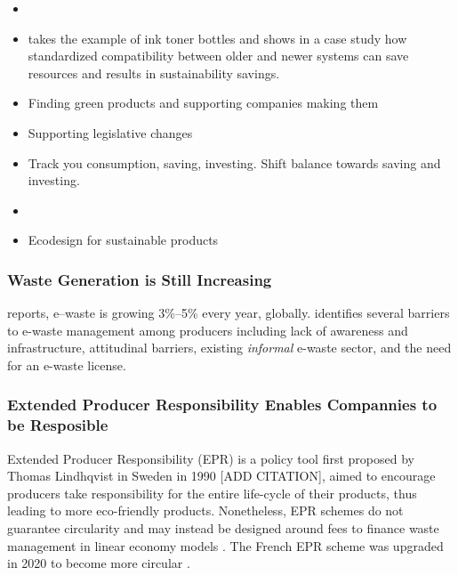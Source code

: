 \documentclass[
  letterpaper,
  DIV=11,
  numbers=noendperiod]{scrartcl}
\begin{document}
\begin{itemize}
\item
  \citet{RUIZPASTOR2022130495}
\item
  \citet{MIYOSHI2022267} takes the example of ink toner bottles and
  shows in a case study how standardized compatibility between older and
  newer systems can save resources and results in sustainability
  savings.
\item
  Finding green products and supporting companies making them
\item
  Supporting legislative changes
\item
  Track you consumption, saving, investing. Shift balance towards saving
  and investing.
\item
  \citet{nastaraanvadoodiEcodesignRequirementsDrive2022}
\item
  \citet{europeancommissionEcodesignSustainableProducts2022} Ecodesign
  for sustainable products
\end{itemize}

\subsubsection{Waste Generation is Still
Increasing}\label{waste-generation-is-still-increasing}

\citet{liuGlobalPerspectiveEwaste2023} reports, e--waste is growing
3\%--5\% every year, globally.
\citep{thukralExploratoryStudyProducer2023} identifies several barriers
to e-waste management among producers including lack of awareness and
infrastructure, attitudinal barriers, existing \emph{informal} e-waste
sector, and the need for an e-waste license.

\subsubsection{Extended Producer Responsibility Enables Compannies to be
Resposible}\label{extended-producer-responsibility-enables-compannies-to-be-resposible}

Extended Producer Responsibility (EPR) is a policy tool first proposed
by Thomas Lindhqvist in Sweden in 1990 {[}ADD CITATION{]}, aimed to
encourage producers take responsibility for the entire life-cycle of
their products, thus leading to more eco-friendly products. Nonetheless,
EPR schemes do not guarantee circularity and may instead be designed
around fees to finance waste management in linear economy models
\citep{christiansenExtendedProducerResponsibility2021}. The French EPR
scheme was upgraded in 2020 to become more circular
\citep{jacquesvernierExtendedProducerResponsibility2021}.
\end{document}

